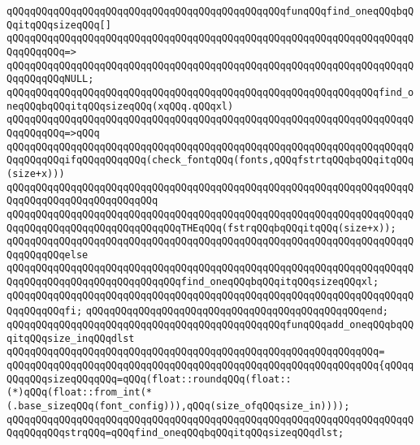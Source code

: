 \newline
\verb|qQQqqQQqqQQqqQQqqQQqqQQqqQQqqQQqqQQqqQQqqQQqqQQqfunqQQqfind_oneqQQqbqQQqitqQQqsizeqQQq[]|\newline
\verb|qQQqqQQqqQQqqQQqqQQqqQQqqQQqqQQqqQQqqQQqqQQqqQQqqQQqqQQqqQQqqQQqqQQqqQQqqQQqqQQq=>|\newline
\verb|qQQqqQQqqQQqqQQqqQQqqQQqqQQqqQQqqQQqqQQqqQQqqQQqqQQqqQQqqQQqqQQqqQQqqQQqqQQqqQQqNULL;|\newline
\newline
\verb|qQQqqQQqqQQqqQQqqQQqqQQqqQQqqQQqqQQqqQQqqQQqqQQqqQQqqQQqqQQqqQQqfind_oneqQQqbqQQqitqQQqsizeqQQq(xqQQq.qQQqxl)|\newline
\verb|qQQqqQQqqQQqqQQqqQQqqQQqqQQqqQQqqQQqqQQqqQQqqQQqqQQqqQQqqQQqqQQqqQQqqQQqqQQqqQQq=>qQQq|\newline
\verb|qQQqqQQqqQQqqQQqqQQqqQQqqQQqqQQqqQQqqQQqqQQqqQQqqQQqqQQqqQQqqQQqqQQqqQQqqQQqqQQqifqQQqqQQqqQQq(check_fontqQQq(fonts,qQQqfstrtqQQqbqQQqitqQQq(size+x)))|\newline
\verb|qQQqqQQqqQQqqQQqqQQqqQQqqQQqqQQqqQQqqQQqqQQqqQQqqQQqqQQqqQQqqQQqqQQqqQQqqQQqqQQqqQQqqQQqqQQqqQQq|\newline
\verb|qQQqqQQqqQQqqQQqqQQqqQQqqQQqqQQqqQQqqQQqqQQqqQQqqQQqqQQqqQQqqQQqqQQqqQQqqQQqqQQqqQQqqQQqqQQqqQQqqQQqTHEqQQq(fstrqQQqbqQQqitqQQq(size+x));|\newline
\verb|qQQqqQQqqQQqqQQqqQQqqQQqqQQqqQQqqQQqqQQqqQQqqQQqqQQqqQQqqQQqqQQqqQQqqQQqqQQqqQQqelse|\newline
\verb|qQQqqQQqqQQqqQQqqQQqqQQqqQQqqQQqqQQqqQQqqQQqqQQqqQQqqQQqqQQqqQQqqQQqqQQqqQQqqQQqqQQqqQQqqQQqqQQqqQQqfind_oneqQQqbqQQqitqQQqsizeqQQqxl;|\newline
\verb|qQQqqQQqqQQqqQQqqQQqqQQqqQQqqQQqqQQqqQQqqQQqqQQqqQQqqQQqqQQqqQQqqQQqqQQqqQQqqQQqfi;|\newline
\verb|qQQqqQQqqQQqqQQqqQQqqQQqqQQqqQQqqQQqqQQqqQQqqQQqend;|\newline
\newline
\verb|qQQqqQQqqQQqqQQqqQQqqQQqqQQqqQQqqQQqqQQqqQQqqQQqfunqQQqadd_oneqQQqbqQQqitqQQqsize_inqQQqdlst|\newline
\verb|qQQqqQQqqQQqqQQqqQQqqQQqqQQqqQQqqQQqqQQqqQQqqQQqqQQqqQQqqQQqqQQq=|\newline
\verb|qQQqqQQqqQQqqQQqqQQqqQQqqQQqqQQqqQQqqQQqqQQqqQQqqQQqqQQqqQQqqQQq{qQQqqQQqqQQqsizeqQQqqQQq=qQQq(float::roundqQQq(float::(*)qQQq(float::from_int(*(.base_sizeqQQq(font_config))),qQQq(size_ofqQQqsize_in))));|\newline
\verb|qQQqqQQqqQQqqQQqqQQqqQQqqQQqqQQqqQQqqQQqqQQqqQQqqQQqqQQqqQQqqQQqqQQqqQQqqQQqqQQqstrqQQq=qQQqfind_oneqQQqbqQQqitqQQqsizeqQQqdlst;|\newline
